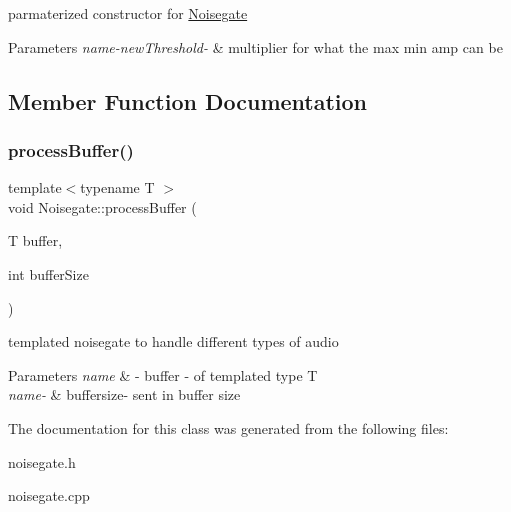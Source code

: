 parmaterized constructor for \hyperlink{classNoisegate}{Noisegate} 
\begin{DoxyParams}{Parameters}
{\em name-\/new\+Threshold-\/} & multiplier for what the max min amp can be \\
\hline
\end{DoxyParams}


\subsection{Member Function Documentation}
\mbox{\label{classNoisegate_aee5ff92d38286e509055fa6d117415fd}} 
\subsubsection{\texorpdfstring{process\+Buffer()}{processBuffer()}}
{\footnotesize\ttfamily template$<$typename T $>$ \\
void Noisegate\+::process\+Buffer (\begin{DoxyParamCaption}\item[{T}]{buffer,  }\item[{int}]{buffer\+Size }\end{DoxyParamCaption})\hspace{0.3cm}{\ttfamily [inline]}}

templated noisegate to handle different types of audio 
\begin{DoxyParams}{Parameters}
{\em name} & -\/ buffer -\/ of templated type T \\
\hline
{\em name-\/} & buffersize-\/ sent in buffer size \\
\hline
\end{DoxyParams}


The documentation for this class was generated from the following files\+:\begin{DoxyCompactItemize}
\item 
noisegate.\+h\item 
noisegate.\+cpp\end{DoxyCompactItemize}
